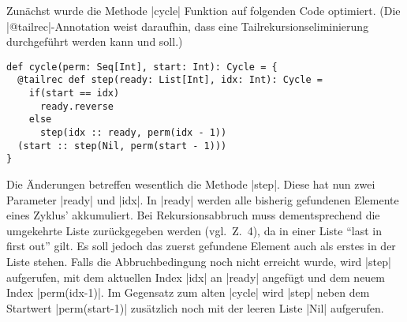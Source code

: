 Zunächst wurde die Methode |cycle| Funktion auf folgenden Code optimiert. (Die |@tailrec|-Annotation weist daraufhin, dass eine Tailrekursionseliminierung durchgeführt werden kann und soll.)
\begin{lstlisting}
def cycle(perm: Seq[Int], start: Int): Cycle = {
  @tailrec def step(ready: List[Int], idx: Int): Cycle =
    if(start == idx)
      ready.reverse
    else
      step(idx :: ready, perm(idx - 1))
  (start :: step(Nil, perm(start - 1)))
}
\end{lstlisting}
Die Änderungen betreffen wesentlich die Methode |step|. Diese hat nun zwei Parameter |ready| und |idx|.
In |ready| werden alle bisherig gefundenen Elemente eines Zyklus' akkumuliert.
Bei Rekursionsabbruch muss dementsprechend die umgekehrte Liste zurückgegeben werden (vgl.\ Z.\ 4), da in einer Liste ``last in first out'' gilt.
Es soll jedoch das zuerst gefundene Element auch als erstes in der Liste stehen.
Falls die Abbruchbedingung noch nicht erreicht wurde, wird |step| aufgerufen, mit dem aktuellen Index |idx| an |ready| angefügt und dem neuem Index |perm(idx-1)|.
Im Gegensatz zum alten |cycle| wird |step| neben dem Startwert |perm(start-1)| zusätzlich noch mit der leeren Liste |Nil| aufgerufen.

